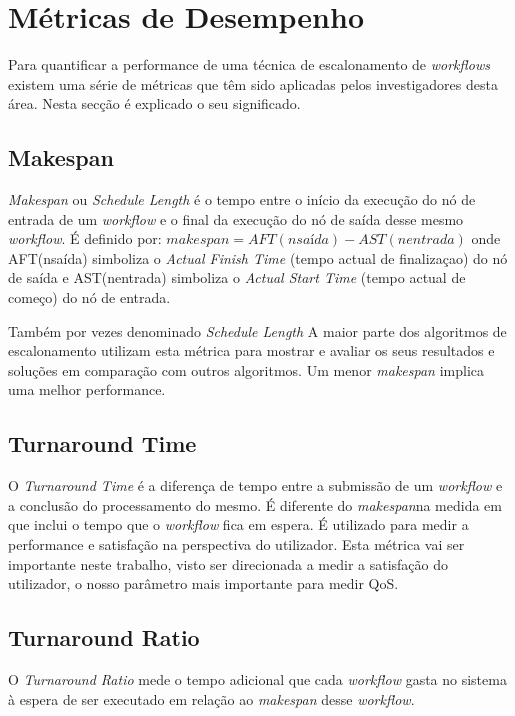\section{Métricas de Desempenho}
Para quantificar a performance de uma técnica de escalonamento de \textit{workflows} existem uma série de métricas que têm sido aplicadas pelos investigadores desta área. Nesta secção é explicado o seu significado.

\subsection{Makespan}
\textit{Makespan} ou \textit{Schedule Length} é o tempo entre o início da execução do nó de entrada de um \textit{workflow} e o final da execução do nó de saída desse mesmo \textit{workflow}.
É definido por: $makespan = AFT(nsaída)-AST(nentrada)$ onde AFT(nsaída) simboliza o \textit{Actual Finish Time} (tempo actual de finalizaçao) do nó de saída e AST(nentrada) simboliza o \textit{Actual Start Time} (tempo actual de começo) do nó de entrada.
\cite{Arabnejad}

Também por vezes denominado \textit{Schedule Length}
A maior parte dos algoritmos de escalonamento utilizam esta métrica para mostrar e avaliar os seus resultados e soluções em comparação com outros algoritmos.
Um menor \textit{makespan} implica uma melhor performance.
\cite{Arabnejad}

\subsection{Turnaround Time}
O \textit{Turnaround Time} é a diferença de tempo entre a submissão de um \textit{workflow} e a conclusão do processamento do mesmo. É diferente do \textit{makespan}na medida
em que inclui o tempo que o \textit{workflow} fica em espera. É utilizado para medir a performance e satisfação na perspectiva do utilizador.\cite{Arabnejad}
Esta métrica vai ser importante neste trabalho, visto ser direcionada a medir a satisfação do utilizador, o nosso parâmetro mais importante para medir QoS.

\subsection{Turnaround Ratio}
O \textit{Turnaround Ratio} mede o tempo adicional que cada \textit{workflow} gasta no sistema à espera de ser executado em relação ao \textit{makespan} desse \textit{workflow}.\cite{Arabnejad}

